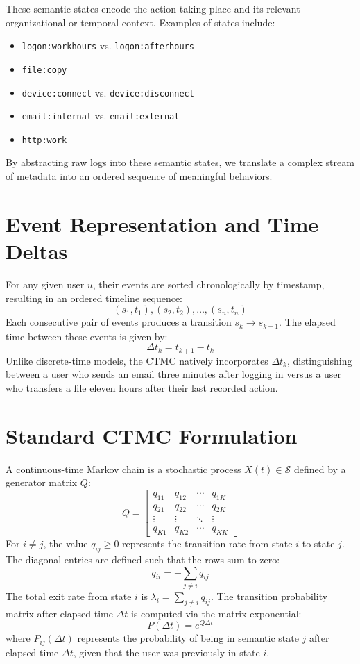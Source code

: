 These semantic states encode the action taking place and its relevant organizational or temporal context. Examples of states include:
\begin{itemize}
    \item \texttt{logon:workhours} vs. \texttt{logon:afterhours}
    \item \texttt{file:copy}
    \item \texttt{device:connect} vs. \texttt{device:disconnect}
    \item \texttt{email:internal} vs. \texttt{email:external}
    \item \texttt{http:work}
\end{itemize}
By abstracting raw logs into these semantic states, we translate a complex stream of metadata into an ordered sequence of meaningful behaviors.

\section{Event Representation and Time Deltas}
For any given user $u$, their events are sorted chronologically by timestamp, resulting in an ordered timeline sequence:
$$ (s_1, t_1), (s_2, t_2), \dots, (s_n, t_n) $$
Each consecutive pair of events produces a transition $s_k \rightarrow s_{k+1}$. The elapsed time between these events is given by:
$$ \Delta t_k = t_{k+1} - t_k $$
Unlike discrete-time models, the CTMC natively incorporates $\Delta t_k$, distinguishing between a user who sends an email three minutes after logging in versus a user who transfers a file eleven hours after their last recorded action.

\section{Standard CTMC Formulation}
A continuous-time Markov chain is a stochastic process $X(t) \in \mathcal{S}$ defined by a generator matrix $Q$:
$$
Q =
\begin{bmatrix}
q_{11} & q_{12} & \cdots & q_{1K} \\
q_{21} & q_{22} & \cdots & q_{2K} \\
\vdots & \vdots & \ddots & \vdots \\
q_{K1} & q_{K2} & \cdots & q_{KK}
\end{bmatrix}
$$
For $i \neq j$, the value $q_{ij} \ge 0$ represents the transition rate from state $i$ to state $j$. The diagonal entries are defined such that the rows sum to zero:
$$ q_{ii} = -\sum_{j \neq i} q_{ij} $$
The total exit rate from state $i$ is $\lambda_i = \sum_{j \neq i} q_{ij}$. The transition probability matrix after elapsed time $\Delta t$ is computed via the matrix exponential:
$$ P(\Delta t) = e^{Q\Delta t} $$
where $P_{ij}(\Delta t)$ represents the probability of being in semantic state $j$ after elapsed time $\Delta t$, given that the user was previously in state $i$.

